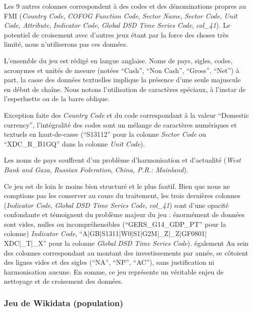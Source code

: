 \documentclass[hidelinks, 12pt]{article}
\begin{document}
Les 9 autres colonnes correspondent à des codes et des dénominations propres au FMI (\textit{Country Code}, \textit{COFOG Function Code}, \textit{Sector Name}, \textit{Sector Code}, \textit{Unit Code}, \textit{Attribute}, \textit{Indicator Code}, \textit{Global DSD Time Series Code}, \textit{col\_41}). Le potentiel de croisement avec d'autres jeux étant par la force des choses très limité, nous n'utiliserons pas ces données.  

L'ensemble du jeu est rédigé en langue anglaise. Noms de pays, sigles, codes, acronymes et unités de mesure (notées \enquote{Cash}, \enquote{Non Cash}, \enquote{Gross}, \enquote{Net}) à part, la casse des données textuelles implique la présence d'une seule majuscule en début de chaîne. Nous notons l'utilisation de caractères spéciaux, à l'instar de l'esperluette ou de la barre oblique.

Exception faite des \textit{Country Code} et du code correspondant à la valeur \enquote{Domestic currency}, l'intégralité des codes sont un mélange de caractères numériques et textuels en haut-de-casse (\enquote{S13112} pour la colonne \textit{Sector Code} ou \enquote{XDC\_R\_B1GQ} dans la colonne \textit{Unit Code}).

Les noms de pays souffrent d'un problème d'harmonisation et d'actualité (\textit{West Bank and Gaza}, \textit{Russian Federation}, \textit{China, P.R.: Mainland}).

Ce jeu est de loin le moins bien structuré et le plus fautif. Bien que nous ne comptions pas les conserver au cours du traitement, les trois dernières colonnes (\textit{Indicator Code}, \textit{Global DSD Time Series Code}, \textit{col\_41}) sont d'une opacité confondante et témoignent du problème majeur du jeu : énormément de données sont vides, nulles ou incompréhensibles (\enquote{GERS\_G14\_GDP\_PT} pour la colonne) \textit{Indicator Code}, \enquote{A|GB|S1311|W0|S1|G2M|\_Z|\_Z|GF0801|
	XDC|\_T|\_X} pour la colonne \textit{Global DSD Time Series Code}).
également
Au sein des colonnes correspondant au montant des investissements par année, se côtoient des lignes vides et des sigles (\enquote{NA}, \enquote{NP}, \enquote{AC}), sans justification ni harmonisation aucune. En somme, ce jeu représente un véritable enjeu de nettoyage et de croisement des données.





%





\subsubsection{Jeu de Wikidata (population)}
\end{document}
